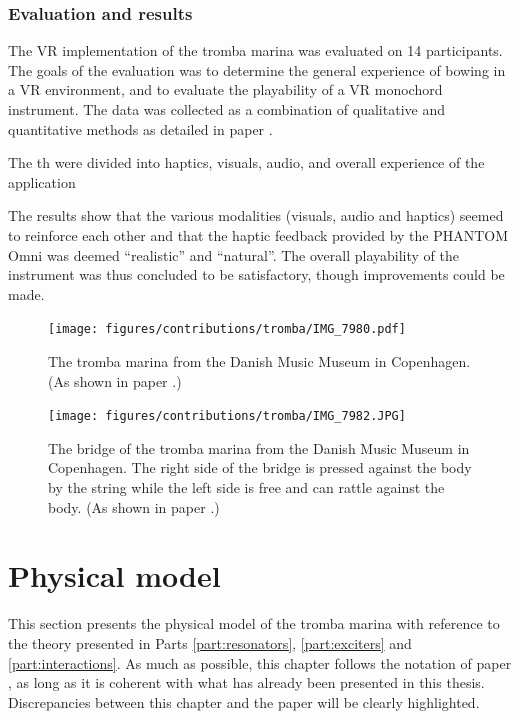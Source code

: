 \subsubsection{Evaluation and results}
The VR implementation of the tromba marina was evaluated on 14 participants. The goals of the evaluation was to determine the general experience of bowing in a VR environment, and to evaluate the playability of a VR monochord instrument.
The data was collected as a combination of qualitative and quantitative methods as detailed in paper \citeP[E]. 

The th were divided into haptics, visuals, audio, and overall experience of the application 

The results show that the various modalities (visuals, audio and haptics) seemed to reinforce each other and that the haptic feedback provided by the PHANTOM Omni was deemed ``realistic'' and ``natural''. The overall playability of the instrument was thus concluded to be satisfactory, though improvements could be made.

\begin{figure}
    \centering
    \texttt{[image: figures/contributions/tromba/IMG\_7980.pdf]}
    \caption{The tromba marina from the Danish Music Museum in Copenhagen. (As shown in paper \citeP[D].)}
\label{fig:tromba}
\end{figure}
  
\begin{figure}
    \centering
    \texttt{[image: figures/contributions/tromba/IMG\_7982.JPG]}
    \caption{The bridge of the tromba marina from the Danish Music Museum in Copenhagen. The right side of the bridge is pressed against the body by the string while the left side is free and can rattle against the body. (As shown in paper \citeP[D].)}
\label{fig:bridge}
\end{figure}

\section{Physical model}
This section presents the physical model of the tromba marina with reference to the theory presented in Parts \ref{part:resonators}, \ref{part:exciters} and \ref{part:interactions}.
As much as possible, this chapter follows the notation of paper \citeP[D], as long as it is coherent with what has already been presented in this thesis. Discrepancies between this chapter and the paper will be clearly highlighted. 

